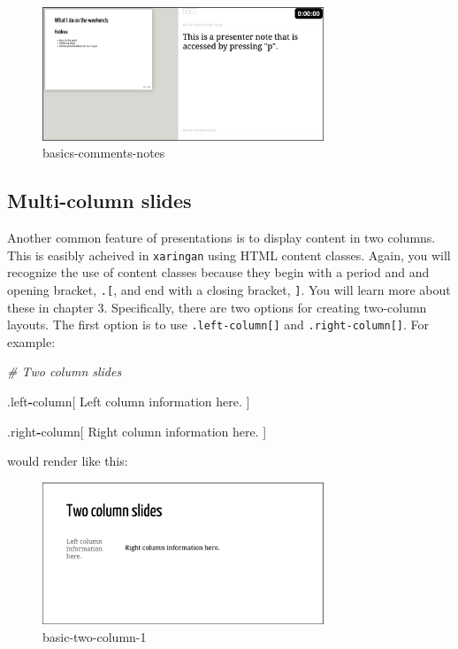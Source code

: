 \documentclass[
]{book}
\newenvironment{Shaded}{\begin{snugshade}}{\end{snugshade}}
\newcommand{\CommentTok}[1]{\textcolor[rgb]{0.37,0.37,0.37}{\textit{#1}}}
\newcommand{\NormalTok}[1]{#1}
\newcommand{\OperatorTok}[1]{\textcolor[rgb]{0.43,0.43,0.43}{\textbf{#1}}}
\begin{document}
\begin{figure}
\centering
\includegraphics[width=0.75\textwidth,height=\textheight]{img/02_basics-comments-notes.png}
\caption{basics-comments-notes}
\end{figure}

\hypertarget{multi-column-slides}{%
\subsection{Multi-column slides}\label{multi-column-slides}}

Another common feature of presentations is to display content in two columns. This is easibly acheived in \texttt{xaringan} using HTML content classes. Again, you will recognize the use of content classes because they begin with a period and and opening bracket, \texttt{.{[}}, and end with a closing bracket, \texttt{{]}}. You will learn more about these in chapter 3. Specifically, there are two options for creating two-column layouts. The first option is to use \texttt{.left-column{[}{]}} and \texttt{.right-column{[}{]}}. For example:

\begin{Shaded}
\begin{Highlighting}[]
\CommentTok{# Two column slides}

\NormalTok{.left}\OperatorTok{-}\NormalTok{column[}
\NormalTok{Left column information here.}
\NormalTok{]}

\NormalTok{.right}\OperatorTok{-}\NormalTok{column[}
\NormalTok{Right column information here.}
\NormalTok{]}
\end{Highlighting}
\end{Shaded}

would render like this:

\begin{figure}
\centering
\includegraphics[width=0.75\textwidth,height=\textheight]{img/02_basics-two-column_1.png}
\caption{basic-two-column-1}
\end{figure}
\end{document}

